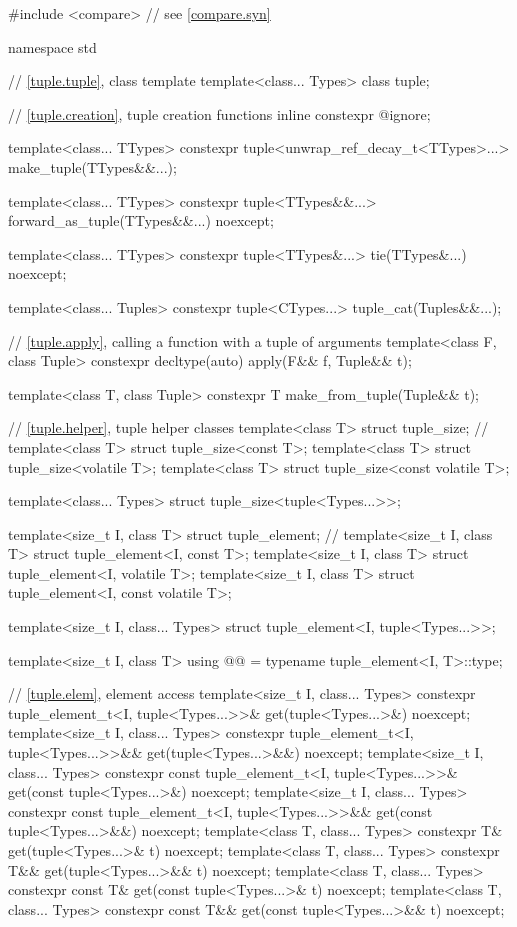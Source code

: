 %
\begin{codeblock}
#include <compare>              // see \ref{compare.syn}

namespace std {
  // \ref{tuple.tuple}, class template 
  template<class... Types>
    class tuple;

  // \ref{tuple.creation}, tuple creation functions
  inline constexpr @\unspec@ ignore;

  template<class... TTypes>
    constexpr tuple<unwrap_ref_decay_t<TTypes>...> make_tuple(TTypes&&...);

  template<class... TTypes>
    constexpr tuple<TTypes&&...> forward_as_tuple(TTypes&&...) noexcept;

  template<class... TTypes>
    constexpr tuple<TTypes&...> tie(TTypes&...) noexcept;

  template<class... Tuples>
    constexpr tuple<CTypes...> tuple_cat(Tuples&&...);

  // \ref{tuple.apply}, calling a function with a tuple of arguments
  template<class F, class Tuple>
    constexpr decltype(auto) apply(F&& f, Tuple&& t);

  template<class T, class Tuple>
    constexpr T make_from_tuple(Tuple&& t);

  // \ref{tuple.helper}, tuple helper classes
  template<class T> struct tuple_size;                  // \notdef
  template<class T> struct tuple_size<const T>;
  template<class T> struct tuple_size<volatile T>;
  template<class T> struct tuple_size<const volatile T>;

  template<class... Types> struct tuple_size<tuple<Types...>>;

  template<size_t I, class T> struct tuple_element;     // \notdef
  template<size_t I, class T> struct tuple_element<I, const T>;
  template<size_t I, class T> struct tuple_element<I, volatile T>;
  template<size_t I, class T> struct tuple_element<I, const volatile T>;

  template<size_t I, class... Types>
    struct tuple_element<I, tuple<Types...>>;

  template<size_t I, class T>
    using @@ = typename tuple_element<I, T>::type;

  // \ref{tuple.elem}, element access
  template<size_t I, class... Types>
    constexpr tuple_element_t<I, tuple<Types...>>& get(tuple<Types...>&) noexcept;
  template<size_t I, class... Types>
    constexpr tuple_element_t<I, tuple<Types...>>&& get(tuple<Types...>&&) noexcept;
  template<size_t I, class... Types>
    constexpr const tuple_element_t<I, tuple<Types...>>& get(const tuple<Types...>&) noexcept;
  template<size_t I, class... Types>
    constexpr const tuple_element_t<I, tuple<Types...>>&& get(const tuple<Types...>&&) noexcept;
  template<class T, class... Types>
    constexpr T& get(tuple<Types...>& t) noexcept;
  template<class T, class... Types>
    constexpr T&& get(tuple<Types...>&& t) noexcept;
  template<class T, class... Types>
    constexpr const T& get(const tuple<Types...>& t) noexcept;
  template<class T, class... Types>
    constexpr const T&& get(const tuple<Types...>&& t) noexcept;

}
\end{codeblock}
